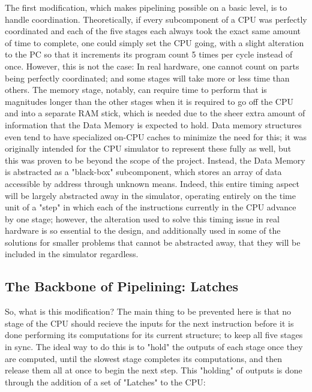 \documentclass[12pt,twoside]{reedthesis}
\begin{document}
The first modification, which makes pipelining possible on a basic level, is to handle coordination. Theoretically, if  every subcomponent of a CPU was perfectly coordinated and each of the five stages each always took the exact same amount of time to complete, one could simply set the CPU going, with a slight alteration to the PC so that it increments its program count 5 times per cycle instead of once. However, this is not the case: In real hardware, one cannot count on parts being perfectly coordinated; and some stages will take more or less time than others. The memory stage, notably, can require time to perform that is magnitudes longer than the other stages when it is required to go off the CPU and into a separate RAM stick, which is needed due to the sheer extra amount of information that the Data Memory is expected to hold. Data memory structures even tend to have specialized on-CPU caches to minimize the need for this; it was originally intended for the CPU simulator to represent these fully as well, but this was proven to be beyond the scope of the project. Instead, the Data Memory is abstracted as a "black-box" subcomponent, which stores an array of data accessible by address through unknown means. Indeed, this entire timing aspect will be largely abstracted away in the simulator, operating entirely on the time unit of a "step" in which each of the instructions currently in the CPU advance by one stage; however, the alteration used to solve this timing issue in real hardware is so essential to the design, and additionally used in some of the solutions for smaller problems that cannot be abstracted away, that they will be included in the simulator regardless.

\subsection{The Backbone of Pipelining: Latches}

So, what is this modification? The main thing to be prevented here is that no stage of the CPU should recieve the inputs for the next instruction before it is done performing its computations for its current structure; to keep all five stages in sync. The ideal way to do this is to "hold" the outputs of each stage once they are computed, until the slowest stage completes its computations, and then release them all at once to begin the next step. This "holding" of outputs is done through the addition of a set of "Latches" to the CPU:
\end{document}

